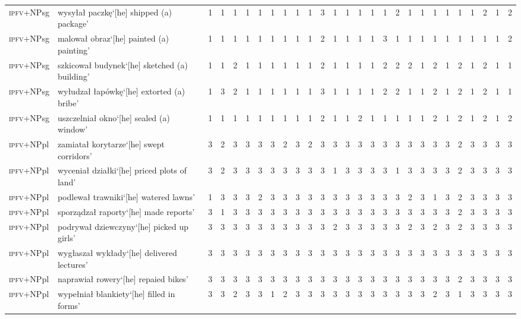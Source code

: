 \documentclass[output=paper]{langscibook}
\begin{document}
\begin{sidewaystable}
{\begin{tabular}{l>{\raggedright}p{5cm}rrrrrrrrrrrrrrrrrrrrrrrrr}
\textsc{ipfv}+NPsg&wysyłał paczkę\newline  `[he] shipped (a) package'&1&1&1&1&1&1&1&1&1&3&1&1&1&1&1&2&1&1&1&1&1&1&2&1&2\\
\textsc{ipfv}+NPsg&malował obraz\newline  `[he] painted (a) painting'&1&1&1&1&1&1&1&1&1&2&1&1&1&1&3&1&1&1&1&1&1&1&1&1&2\\
\textsc{ipfv}+NPsg&szkicował budynek\newline  `[he] sketched (a) building'&1&1&2&1&1&1&1&1&1&2&1&1&1&1&2&2&2&1&2&1&2&1&2&1&1\\
\textsc{ipfv}+NPsg&wyłudzał łapówkę\newline  `[he] extorted (a) bribe'&1&3&2&1&1&1&1&1&1&3&1&1&1&1&2&2&1&1&2&1&2&1&2&1&1\\
\textsc{ipfv}+NPsg&uszczelniał okno\newline  `[he] sealed (a) window'&1&1&1&1&1&1&1&1&1&2&1&1&2&1&1&1&1&1&2&1&2&1&2&1&2\\
\textsc{ipfv}+NPpl&zamiatał korytarze\newline  `[he] swept corridors'&3&2&3&3&3&3&2&3&2&3&3&3&3&3&3&3&3&3&3&3&2&3&3&3&3\\
\textsc{ipfv}+NPpl&wyceniał działki\newline  `[he] priced plots of land'&3&2&3&3&3&3&3&3&3&3&1&3&3&3&3&1&3&3&3&3&2&3&3&3&3\\
\textsc{ipfv}+NPpl&podlewał trawniki\newline  `[he] watered lawns'&1&3&3&3&2&3&3&3&3&3&3&3&3&3&3&3&2&3&1&3&2&3&3&3&3\\
\textsc{ipfv}+NPpl&sporządzał raporty\newline  `[he] made reports'&3&1&3&3&3&3&3&3&3&3&3&3&3&3&3&3&3&3&3&3&2&3&3&3&3\\
\textsc{ipfv}+NPpl&podrywał dziewczyny\newline  `[he] picked up girls'&3&3&3&3&3&3&3&3&3&3&2&3&3&3&3&3&2&3&2&3&2&3&3&3&3\\
\textsc{ipfv}+NPpl&wygłaszał wykłady\newline  `[he] delivered lectures'&3&3&3&3&3&3&3&3&3&3&3&3&3&3&3&3&3&3&3&3&3&3&3&3&3\\
\textsc{ipfv}+NPpl&naprawiał rowery\newline  `[he] repaied bikes'&3&3&3&3&3&3&3&3&3&3&3&3&3&3&3&3&3&3&3&3&2&3&3&3&3\\
\textsc{ipfv}+NPpl&wypełniał blankiety\newline  `[he] filled in forms'&3&3&2&3&3&1&2&3&3&3&3&3&3&3&3&3&3&3&2&3&1&3&3&3&3\\

\end{tabular}}
\end{sidewaystable}
\end{document}
